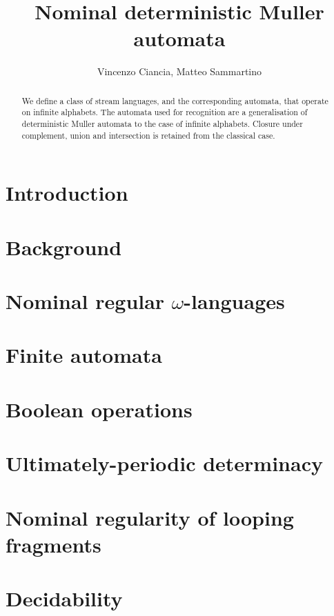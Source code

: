 \documentclass[orivec]{llncs}
\title{Nominal deterministic Muller automata}
\author{Vincenzo Ciancia, Matteo Sammartino}
\institute{}
\begin{document}
\maketitle

\begin{abstract}
 We define a class of stream languages, and the corresponding automata, that operate on infinite alphabets. The automata used for recognition are a generalisation of deterministic Muller automata to the case of infinite alphabets. Closure under complement, union and intersection is retained from the classical case.
\end{abstract}

\section{Introduction}\label{sec:introduction}

\section{Background}\label{sec:background}

\section{Nominal regular $\omega$-languages}\label{sec:languages}


\section{Finite automata}\label{sec:hd-automata}


\section{Boolean operations}\label{sec:boolean-operations}

\section{Ultimately-periodic determinacy}\label{sec:up-determinacy}

\section{Nominal regularity of looping fragments}\label{sec:regularity-of-loop}

\section{Decidability}\label{sec:decidability}



\end{document}
